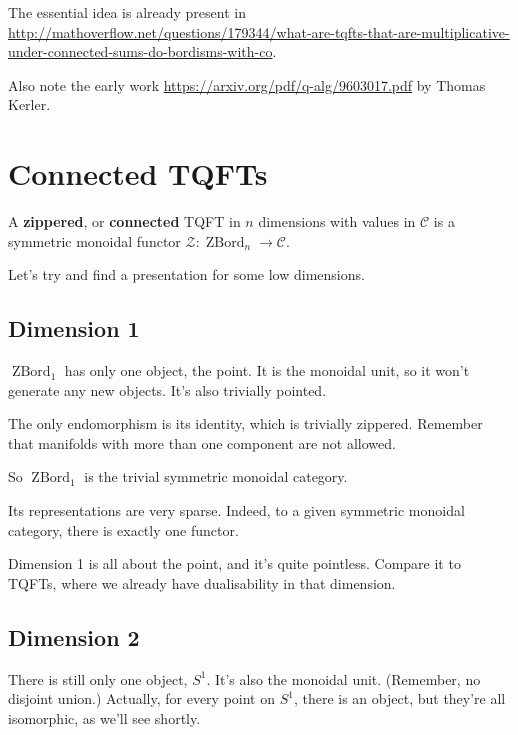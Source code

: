\documentclass[a4paper]{article}
\begin{document}
\begin{remark}
	The essential idea is already present in \href{http://mathoverflow.net/questions/179344/what-are-tqfts-that-are-multiplicative-under-connected-sums-do-bordisms-with-co}{http://mathoverflow.net/questions/179344/what-are-tqfts-that-are-multiplicative-under-connected-sums-do-bordisms-with-co}.
	
	Also note the early work \href{https://arxiv.org/pdf/q-alg/9603017.pdf}{https://arxiv.org/pdf/q-alg/9603017.pdf} by Thomas Kerler.
\end{remark}

\section{Connected TQFTs}

\begin{definition}
	A \textbf{zippered}, or \textbf{connected} TQFT in $n$ dimensions with values in $\mathcal{C}$
	is a symmetric monoidal functor $\mathcal{Z}\colon \operatorname{ZBord}_n \to \mathcal{C}$.
\end{definition}

Let's try and find a presentation for some low dimensions.

\subsection{Dimension 1}

$\operatorname{ZBord}_1$ has only one object,
the point.
It is the monoidal unit,
so it won't generate any new objects.
It's also trivially pointed.

The only endomorphism is its identity,
which is trivially zippered.
Remember that manifolds with more than one component are not allowed.

So $\operatorname{ZBord}_1$ is the trivial symmetric monoidal category.

Its representations are very sparse.
Indeed, to a given symmetric monoidal category,
there is exactly one functor.

Dimension 1 is all about the point,
and it's quite pointless.
Compare it to TQFTs, where we already have dualisability in that dimension.

\subsection{Dimension 2}

There is still only one object, $S^1$.
It's also the monoidal unit.
(Remember, no disjoint union.)
Actually, for every point on $S^1$,
there is an object, but they're all isomorphic,
as we'll see shortly.
\end{document}
